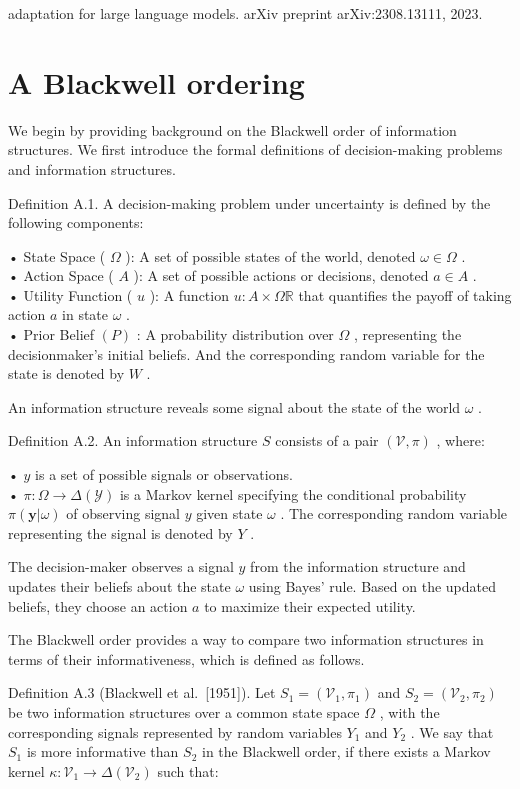 adaptation for large language models. arXiv preprint arXiv:2308.13111,
2023.

\section{A Blackwell ordering}\label{a-blackwell-ordering}

We begin by providing background on the Blackwell order of information
structures. We first introduce the formal definitions of decision-making
problems and information structures.

Definition A.1. A decision-making problem under uncertainty is defined
by the following components:

• State Space ( \(\Omega\) ): A set of possible states of the world,
denoted \(\omega \in \Omega\) .\\
• Action Space ( \(A\) ): A set of possible actions or decisions,
denoted \(a \in A\) .\\
• Utility Function ( \(u\) ): A function
\(u : A \times \Omega  \mathbb { R }\) that quantifies the payoff of
taking action \(a\) in state \(\omega\) .\\
• Prior Belief \(( P )\) : A probability distribution over \(\Omega\) ,
representing the decisionmaker's initial beliefs. And the corresponding
random variable for the state is denoted by \(W\) .

An information structure reveals some signal about the state of the
world \(\omega\) .

Definition A.2. An information structure \(S\) consists of a pair
\(( \mathcal { V } , \pi )\) , where:

• \(y\) is a set of possible signals or observations.\\
• \(\pi : \Omega \to \Delta ( \mathcal { Y } )\) is a Markov kernel
specifying the conditional probability
\(\pi ( \boldsymbol { y } | \omega )\) of observing signal \(y\) given
state \(\omega\) . The corresponding random variable representing the
signal is denoted by \(Y\) .

The decision-maker observes a signal \(y\) from the information
structure and updates their beliefs about the state \(\omega\) using
Bayes' rule. Based on the updated beliefs, they choose an action \(a\)
to maximize their expected utility.

The Blackwell order provides a way to compare two information structures
in terms of their informativeness, which is defined as follows.

Definition A.3 (Blackwell et al.~{[}1951{]}). Let
\(S _ { 1 } = ( \mathcal { V } _ { 1 } , \pi _ { 1 } )\) and
\(S _ { 2 } = ( \mathcal { V } _ { 2 } , \pi _ { 2 } )\) be two
information structures over a common state space \(\Omega\) , with the
corresponding signals represented by random variables \(Y _ { 1 }\) and
\(Y _ { 2 }\) . We say that \(S _ { 1 }\) is more informative than
\(S _ { 2 }\) in the Blackwell order, if there exists a Markov kernel
\(\kappa : \mathcal { V } _ { 1 } \to \Delta ( \mathcal { V } _ { 2 } )\)
such that:

